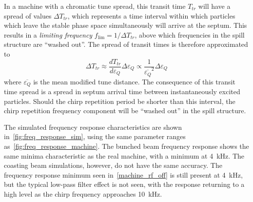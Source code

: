 \documentclass[a4paper,twoside,11pt]{report}
\begin{document}
In a machine with a chromatic tune spread, this transit time $T_{tr}$ will have a spread of values $\Delta T_{tr}$, which represents a time interval within which particles which leave the stable phase space simultaneously will arrive at the septum. This results in a \textit{limiting frequency} $f_{\lim}=1/\Delta T_{tr}$, above which frequencies in the spill structure are ``washed out''. 
The spread of transit times is therefore approximated to~\cite{PhysRevApplied.13.044076, Pullia:313678}
\begin{equation}
  \Delta T_{tr}\approx\frac{dT_{tr}}{d{\varepsilon_Q}}\Delta{\varepsilon_Q}\propto\frac 1{\overline{\varepsilon_Q}^2}\Delta\varepsilon_Q
\end{equation} where $\overline{\varepsilon_Q}$ is the mean modified tune distance. 
The consequence of this transit time spread is a spread in septum arrival time between instantaneously excited particles. Should the chirp repetition period be shorter than this interval, the chirp repetition frequency component will be ``washed out'' in the spill structure.

The simulated frequency response characteristics are shown in~\autoref{fig:freq_response_sim}, using the same parameter ranges as~\autoref{fig:freq_response_machine}. The bunched beam frequency response shows the same minima characteristic as the real machine, with a minimum at \qty{4}{\kilo\hertz}. The coasting beam simulations, however, do not have the same accuracy. The frequency response minimum seen in~\autoref{machine_rf_off} is still present at \qty{4}{\kilo\hertz}, but the typical low-pass filter effect is not seen, with the response returning to a high level as the chirp frequency approaches \qty{10}{\kilo\hertz}.
\end{document}
